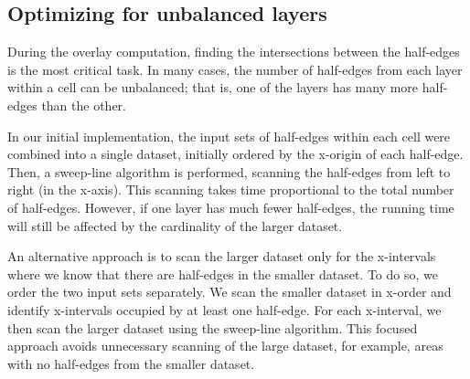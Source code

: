 \subsection{Optimizing for unbalanced layers}\label{sec:unbalance}
During the overlay computation, finding the intersections between the half-edges is the most critical task. In many cases, the number of half-edges from each layer within a cell can be unbalanced; that is, one of the layers has many more half-edges than the other.

In our initial implementation, the input sets of half-edges within each cell were combined into a single dataset, initially ordered by the x-origin of each half-edge.  Then, a sweep-line algorithm is performed, scanning the half-edges from left to right (in the x-axis). This scanning takes time proportional to the total number of half-edges. However, if one layer has much fewer half-edges, the running time will still be affected by the cardinality of the larger dataset.

An alternative approach is to scan the larger dataset only for the x-intervals where we know that there are half-edges in the smaller dataset. To do so, we order the two input sets separately. We scan the smaller dataset in x-order and identify x-intervals occupied by at least one half-edge. For each x-interval, we then scan the larger dataset using the sweep-line algorithm. This focused approach avoids unnecessary scanning of the large dataset, for example, areas with no half-edges from the smaller dataset.
